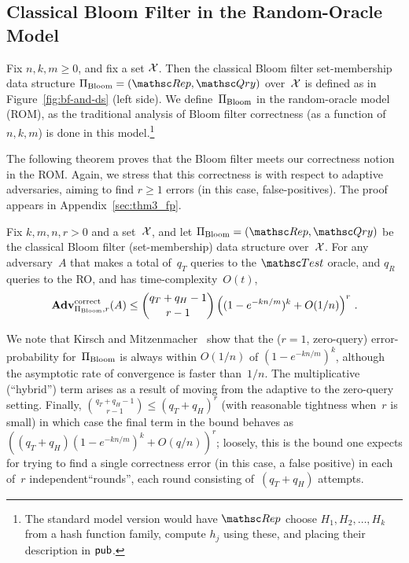 \subsection{Classical Bloom Filter in the Random-Oracle Model}


Fix $n,k,m \geq 0$, and fix a set ${\cal X}$.  Then the classical Bloom
filter set-membership data structure $\setprim_{\mathrm{Bloom}}=
(\Rep, \Qry)$ over~${\cal X}$ is defined as in
Figure~\ref{fig:bf-and-ds} (left side).  We
define~$\Pi_{\mathrm{Bloom}}$ in the random-oracle model
(ROM), as the traditional analysis of Bloom filter correctness (as a
function of $n,k,m$) is done in this model.\footnote{The standard
model version would have $\Rep$ choose $H_1,H_2,\ldots,H_k$ from a
hash function family, compute $h_j$ using these, and placing their
description in ${\sf pub}$.}

 The following theorem proves that the Bloom
filter meets our correctness notion in the ROM.  Again, we stress
that this correctness is with respect to adaptive adversaries,
aiming to find $r \geq 1$ errors (in this case, false-positives).
The proof appears in Appendix~\ref{sec:thm3_fp}. 

\begin{theorem}\label{thm3}\label{thm:bf-correctness}
Fix $k,m,n,r>0$ and a set~${\cal X}$, and let
$\setprim_{\mathrm{Bloom}}= (\Rep, \Qry)$ be the classical Bloom
filter (set-membership) data structure over~${\cal X}$. For any
adversary~$A$ that makes a total of~$q_T$ queries to the $\Test$
oracle, and $q_R$ queries to the RO, and has time-complexity~$O(t)$,
\[
\mathrm{\mathbf{Adv}}^{\mathrm{correct}}_{\Pi_{\mathrm{Bloom}},r}(A) \leq  {\dbinom{q_T + q_H-1}{r-1}} \left( (1-e^{-kn/m})^k + O(1/n) \right)^r\,.
\]
\end{theorem}
We note that Kirsch and Mitzenmacher~\cite{kirsch2006less} show
that the ($r=1$, zero-query) error-probability for~$\Pi_\mathrm{Bloom}$ is
always within $O(1/n)$ of $(1-e^{-kn/m})^k$, although the asymptotic
rate of convergence is faster than~$1/n$.  The multiplicative (``hybrid'') term arises as a result
of moving from the adaptive to the zero-query setting.
Finally, $\binom{q_T+q_H-1}{r-1} \leq (q_T+q_H)^r$ (with reasonable tightness when~$r$ is small) in
which case the final term in the bound behaves as
$((q_T+q_H) (1-e^{-kn/m})^k + O(q/n) )^r$; loosely, this is the bound one expects for
trying to find a single correctness error (in this case, a false positive) in each of~$r$ independent``rounds'', each round
consisting of~$(q_T+q_H)$ attempts.


